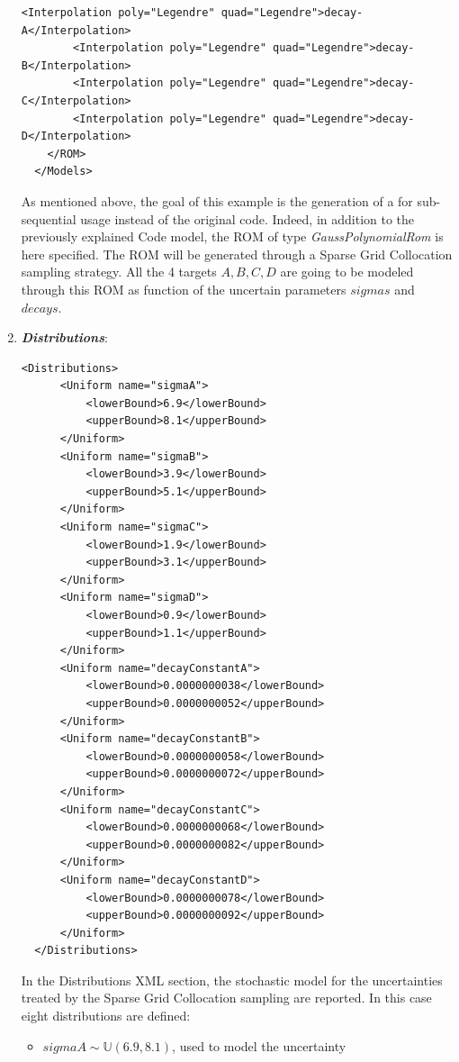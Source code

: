 \begin{enumerate}
\begin{lstlisting}[style=XML,morekeywords={arg,extension,pauseAtEnd,overwrite}]
        <Interpolation poly="Legendre" quad="Legendre">decay-A</Interpolation>
        <Interpolation poly="Legendre" quad="Legendre">decay-B</Interpolation>
        <Interpolation poly="Legendre" quad="Legendre">decay-C</Interpolation>
        <Interpolation poly="Legendre" quad="Legendre">decay-D</Interpolation>
    </ROM>
  </Models>
\end{lstlisting}
 As mentioned above, the goal of this example is the generation of a  
 for sub-sequential usage instead of the original code. Indeed, in addition to the previously explained Code model,
 the ROM of type \textit{GaussPolynomialRom} is here specified. The ROM will be generated through a Sparse Grid
 Collocation sampling strategy. All the 4 targets $A,B,C,D$ are going to be modeled through this ROM as function
 of the uncertain parameters $sigmas$ and $decays$.
   \item \textbf{\textit{Distributions}}:
\begin{lstlisting}[style=XML,morekeywords={arg,extension,pauseAtEnd,overwrite}]
  <Distributions>
      <Uniform name="sigmaA">
          <lowerBound>6.9</lowerBound>
          <upperBound>8.1</upperBound>
      </Uniform>
      <Uniform name="sigmaB">
          <lowerBound>3.9</lowerBound>
          <upperBound>5.1</upperBound>
      </Uniform>
      <Uniform name="sigmaC">
          <lowerBound>1.9</lowerBound>
          <upperBound>3.1</upperBound>
      </Uniform>
      <Uniform name="sigmaD">
          <lowerBound>0.9</lowerBound>
          <upperBound>1.1</upperBound>
      </Uniform>
      <Uniform name="decayConstantA">
          <lowerBound>0.0000000038</lowerBound>
          <upperBound>0.0000000052</upperBound>
      </Uniform>
      <Uniform name="decayConstantB">
          <lowerBound>0.0000000058</lowerBound>
          <upperBound>0.0000000072</upperBound>
      </Uniform>
      <Uniform name="decayConstantC">
          <lowerBound>0.0000000068</lowerBound>
          <upperBound>0.0000000082</upperBound>
      </Uniform>
      <Uniform name="decayConstantD">
          <lowerBound>0.0000000078</lowerBound>
          <upperBound>0.0000000092</upperBound>
      </Uniform>
  </Distributions>
\end{lstlisting}
  In the Distributions XML section, the stochastic model for the 
  uncertainties  treated by the Sparse Grid Collocation sampling are reported. In 
  this case eight distributions are defined: 
  \begin{itemize}
    \item $sigmaA \sim \mathbb{U}(6.9,8.1)$, used to model the uncertainty 

\end{itemize}
\end{enumerate}

